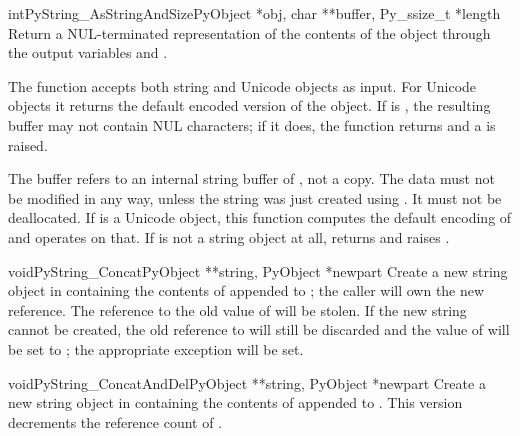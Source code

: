 \begin{cfuncdesc}{int}{PyString_AsStringAndSize}{PyObject *obj,
                                                 char **buffer,
                                                 Py_ssize_t *length}
  Return a NUL-terminated representation of the contents of the
  object  through the output variables  and
  .

  The function accepts both string and Unicode objects as input. For
  Unicode objects it returns the default encoded version of the
  object.  If  is \NULL{}, the resulting buffer may not
  contain NUL characters; if it does, the function returns 
  and a  is raised.

  The buffer refers to an internal string buffer of , not a
  copy. The data must not be modified in any way, unless the string
  was just created using .  It must not be deallocated.  If  is a
  Unicode object, this function computes the default encoding of
   and operates on that.  If  is not a string
  object at all,  returns
   and raises .
\end{cfuncdesc}

\begin{cfuncdesc}{void}{PyString_Concat}{PyObject **string,
                                         PyObject *newpart}
  Create a new string object in  containing the contents
  of  appended to ; the caller will own the
  new reference.  The reference to the old value of  will
  be stolen.  If the new string cannot be created, the old reference
  to  will still be discarded and the value of
   will be set to \NULL{}; the appropriate exception will
  be set.
\end{cfuncdesc}

\begin{cfuncdesc}{void}{PyString_ConcatAndDel}{PyObject **string,
                                               PyObject *newpart}
  Create a new string object in  containing the contents
  of  appended to .  This version decrements
  the reference count of .
\end{cfuncdesc}

